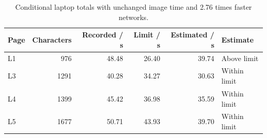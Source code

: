 \begin{table}[H]\centering\small
\begin{tabular}{lrrrrl}\toprule
Page & Characters & Recorded / s & Limit / s & Estimated / s & Estimate\\\midrule
L1 & 976 & 48.48 & 26.40 & 39.74 & Above limit\\
L3 & 1291 & 40.28 & 34.27 & 30.63 & Within limit\\
L4 & 1399 & 45.42 & 36.98 & 35.59 & Within limit\\
L5 & 1677 & 50.71 & 43.93 & 39.70 & Within limit\\
\bottomrule\end{tabular}
\caption{Conditional laptop totals with unchanged image time and 2.76 times faster networks.}\label{tab:res-laptop-projection}\end{table}
